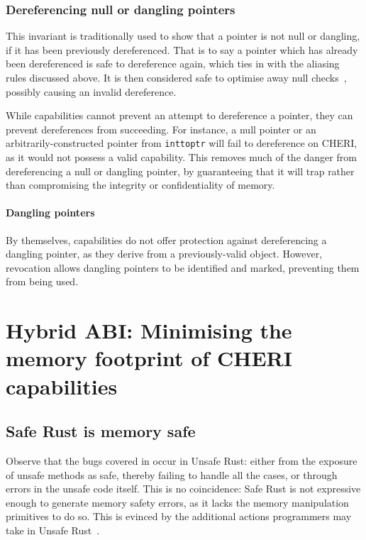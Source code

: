 \documentclass[dissertation.tex]{subfiles}
\begin{document}
\subsubsection{Dereferencing null or dangling pointers}
This invariant is traditionally used to show that a pointer is not
null or dangling, if it has been previously dereferenced.
That is to say a pointer which has already been dereferenced is safe to
dereference again, which ties in with the aliasing rules discussed
above.
It is then considered safe to optimise away null
checks~\cite{wang2013towards,llvm-undef-dce}, possibly causing an
invalid dereference.

While capabilities cannot prevent an attempt to dereference a pointer,
they can prevent dereferences from succeeding.
For instance, a null pointer or an arbitrarily-constructed pointer from
\texttt{inttoptr} will fail to dereference on CHERI, as it would not
possess a valid capability.
This removes much of the danger from dereferencing a null or dangling
pointer, by guaranteeing that it will trap rather than compromising the
integrity or confidentiality of memory.

\paragraph{Dangling pointers}
By themselves, capabilities do not offer protection against
dereferencing a dangling pointer, as they derive from a previously-valid
object.
However, revocation allows dangling pointers to be identified and
marked, preventing them from being used.


\section{Hybrid ABI: Minimising the memory footprint of CHERI capabilities}
\label{sec:eval-hybrid}

\subsection{Safe Rust is memory safe}
Observe that the bugs covered in  occur in Unsafe
Rust: either from the exposure of unsafe methods as safe, thereby
failing to handle all the cases, or through errors in the unsafe code
itself.
This is no coincidence: Safe Rust is not expressive enough to generate
memory safety errors, as it lacks the memory manipulation primitives to
do so.
This is evinced by the additional actions programmers may take in Unsafe
Rust~\cite{rust-nomicon-safe-unsafe}.
\end{document}
